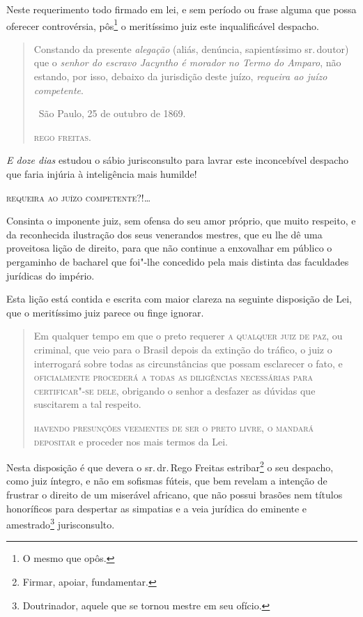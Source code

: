 Neste requerimento todo firmado em lei, e sem período ou frase alguma
que possa oferecer controvérsia, pôs\footnote{O mesmo que opôs.} o
meritíssimo juiz este inqualificável despacho.

\begin{quote}
Constando da presente \emph{alegação} (aliás, denúncia, sapientíssimo
sr.\,doutor) que o \emph{senhor do escravo Jacyntho é morador no Termo do
Amparo}, não estando, por isso, debaixo da jurisdição deste juízo,
\emph{requeira ao juízo competente}.

\hfill\ São Paulo, 25 de outubro de 1869.

\hfill\textsc{rego freitas.}
\end{quote}

\emph{E doze dias} estudou o sábio jurisconsulto para lavrar este
inconcebível despacho que faria injúria à inteligência mais humilde!

\textsc{requeira ao juízo competente?!}\ldots{}

Consinta o imponente juiz, sem ofensa do seu amor próprio, que muito
respeito, e da reconhecida ilustração dos seus venerandos mestres, que
eu lhe dê uma proveitosa lição de direito, para que não continue a
enxovalhar em público o pergaminho de bacharel que foi"-lhe concedido
pela mais distinta das faculdades jurídicas do império.

Esta lição está contida e escrita com maior clareza na seguinte
disposição de Lei, que o meritíssimo juiz parece ou finge ignorar.

\begin{quote}
Em qualquer tempo em que o preto requerer \textsc{a qualquer juiz de paz}, ou
criminal, que veio para o Brasil depois da extinção do tráfico, o juiz o
interrogará sobre todas as circunstâncias que possam esclarecer o fato,
e \textsc{oficialmente procederá a todas as diligências necessárias para
certificar"-se dele}, obrigando o senhor a desfazer as dúvidas que
suscitarem a tal respeito.

\textsc{havendo presunções veementes de ser o preto livre, o mandará depositar} e
proceder nos mais termos da Lei.
\end{quote}

Nesta disposição é que devera o sr.\,dr.\,Rego Freitas estribar\footnote{
  Firmar, apoiar, fundamentar.} o seu despacho, como juiz íntegro, e não
em sofismas fúteis, que bem revelam a intenção de frustrar o direito de
um miserável africano, que não possui brasões nem títulos honoríficos
para despertar as simpatias e a veia jurídica do eminente e
amestrado\footnote{Doutrinador, aquele que se tornou mestre em seu
  ofício.} jurisconsulto.


